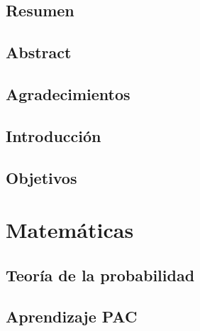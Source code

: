 \documentclass[oneside,openany,titlepage,dottedtoc,headinclude,%
               footinclude=true,cleardoublepage=empty,abstractoff, %
               paper=a4,fontsize=11pt,%
               ]{scrreprt}
\begin{document}
\makeatletter
\makeatother



\chapter*{Resumen}
  
\chapter*{Abstract}
  
\chapter*{Agradecimientos}
  

\setcounter{tocdepth}{1}
\tableofcontents

\break 

\setcounter{page}{1}

\makeatletter
\makeatother

\chapter{Introducción}
 
\chapter{Objetivos}
 


\part{Matemáticas}  
  \chapter{Teoría de la probabilidad}
    
  \chapter{Aprendizaje PAC}
    
    
\end{document}

